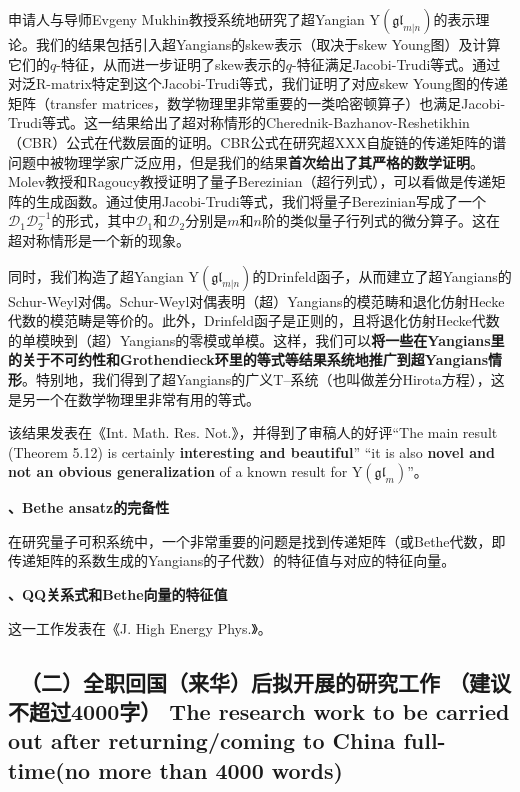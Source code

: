 \documentclass[12pt,UTF8,AutoFakeBold=4,a4paper]{ctexart}
\begin{document}
申请人与导师Evgeny Mukhin教授系统地研究了超Yangian $\mathrm{Y}(\mathfrak{gl}_{m|n})$的表示理论。我们的结果包括引入超Yangians的skew表示（取决于skew Young图）及计算它们的$q$-特征，从而进一步证明了skew表示的$q$-特征满足Jacobi-Trudi等式。通过对泛R-matrix特定到这个Jacobi-Trudi等式，我们证明了对应skew Young图的传递矩阵（transfer matrices，数学物理里非常重要的一类哈密顿算子）也满足Jacobi-Trudi等式。这一结果给出了超对称情形的Cherednik-Bazhanov-Reshetikhin （CBR）公式在代数层面的证明。CBR公式在研究超XXX自旋链的传递矩阵的谱问题中被物理学家广泛应用，但是我们的结果\textbf{首次给出了其严格的数学证明}。Molev教授和Ragoucy教授证明了量子Berezinian（超行列式），可以看做是传递矩阵的生成函数。通过使用Jacobi-Trudi等式，我们将量子Berezinian写成了一个$\mathcal D_1\mathcal D_2^{-1}$的形式，其中$\mathcal D_1$和$\mathcal D_2$分别是$m$和$n$阶的类似量子行列式的微分算子。这在超对称情形是一个新的现象。

同时，我们构造了超Yangian $\mathrm{Y}(\mathfrak{gl}_{m|n})$的Drinfeld函子，从而建立了超Yangians的Schur-Weyl对偶。Schur-Weyl对偶表明（超）Yangians的模范畴和退化仿射Hecke代数的模范畴是等价的。此外，Drinfeld函子是正则的，且将退化仿射Hecke代数的单模映到（超）Yangians的零模或单模。这样，我们可以\textbf{将一些在Yangians里的关于不可约性和Grothendieck环里的等式等结果系统地推广到超Yangians情形}。特别地，我们得到了超Yangians的广义T--系统（也叫做差分Hirota方程），这是另一个在数学物理里非常有用的等式。

该结果发表在《Int. Math. Res. Not.》，并得到了审稿人的好评“The main result (Theorem 5.12) is certainly \textbf{interesting and
beautiful}” “it is also \textbf{novel and not an obvious generalization} of a known
result for $\mathrm{Y}(\mathfrak{gl}_m)$”。


\medskip

\textbf{、Bethe ansatz的完备性}

在研究量子可积系统中，一个非常重要的问题是找到传递矩阵（或Bethe代数，即传递矩阵的系数生成的Yangians的子代数）的特征值与对应的特征向量。

\medskip

\textbf{、QQ关系式和Bethe向量的特征值}

这一工作发表在《J. High Energy Phys.》。

{\color{MsBlue} \subsection{\sihao \kaishu \quad \ 
\textbf{（二）全职回国（来华）后拟开展的研究工作} {\normalfont（建议不超过4000字）} 
\bfseries \xiaosihao {} 
The research work to 
be carried out after returning/coming to China full-time(no more than 4000 words)} 
}
\end{document}
